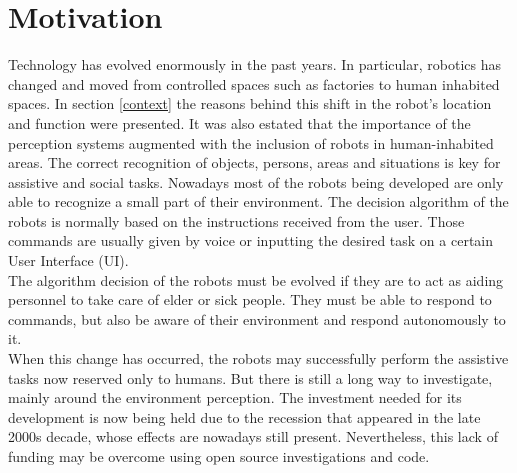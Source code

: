 
\section{Motivation}

Technology has evolved enormously in the past years. 
In particular, robotics has changed and moved from controlled spaces such as factories to human inhabited spaces. 
In section \ref{context} the reasons behind this shift in the robot's location and function were presented. 
It was also estated that the importance of the perception systems augmented with the inclusion of robots in human-inhabited areas. 
The correct recognition of objects, persons, areas and situations is key for assistive and social tasks. 
Nowadays most of the robots being developed are only able to recognize a small part of their environment. 
The decision algorithm of the robots is normally based on the instructions received from the user. 
Those commands are usually given by voice or inputting the desired task on a certain User Interface (UI).
\\

The algorithm decision of the robots must be evolved if they are to act as aiding personnel to take care of elder or sick people. 
They must be able to respond to commands, but also be aware of their environment and respond autonomously to it. 
\\
When this change has occurred, the robots may successfully perform the assistive tasks now reserved only to humans. 
But there is still a long way to investigate, mainly around the environment perception. 
The investment needed for its development is now being held due to the recession that appeared in the late 2000s decade, whose effects are nowadays still present. 
Nevertheless, this lack of funding may be overcome using open source investigations and code. 

